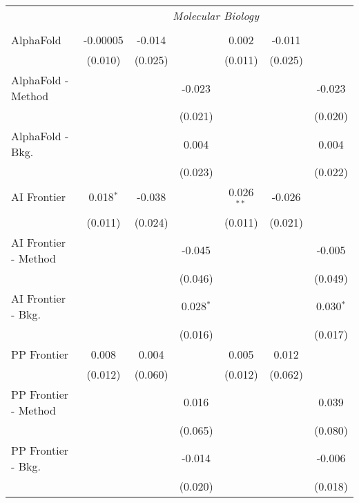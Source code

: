 \begin{tabular}{lcccccc}
 & \multicolumn{6}{c}{\textit{Molecular Biology}} \\ \\
   AlphaFold            & -0.00005    & -0.014  &                & 0.002        & -0.011  &   \\   
                        & (0.010)     & (0.025) &                & (0.011)      & (0.025) &   \\   
   AlphaFold - Method   &             &         & -0.023         &              &         & -0.023\\   
                        &             &         & (0.021)        &              &         & (0.020)\\   
   AlphaFold - Bkg.     &             &         & 0.004          &              &         & 0.004\\   
                        &             &         & (0.023)        &              &         & (0.022)\\   
   AI Frontier          & 0.018$^{*}$ & -0.038  &                & 0.026$^{**}$ & -0.026  &   \\   
                        & (0.011)     & (0.024) &                & (0.011)      & (0.021) &   \\   
   AI Frontier - Method &             &         & -0.045         &              &         & -0.005\\   
                        &             &         & (0.046)        &              &         & (0.049)\\   
   AI Frontier - Bkg.   &             &         & 0.028$^{*}$    &              &         & 0.030$^{*}$\\   
                        &             &         & (0.016)        &              &         & (0.017)\\   
   PP Frontier          & 0.008       & 0.004   &                & 0.005        & 0.012   &   \\   
                        & (0.012)     & (0.060) &                & (0.012)      & (0.062) &   \\   
   PP Frontier - Method &             &         & 0.016          &              &         & 0.039\\   
                        &             &         & (0.065)        &              &         & (0.080)\\   
   PP Frontier - Bkg.   &             &         & -0.014         &              &         & -0.006\\   
                        &             &         & (0.020)        &              &         & (0.018)\\   

\end{tabular}
